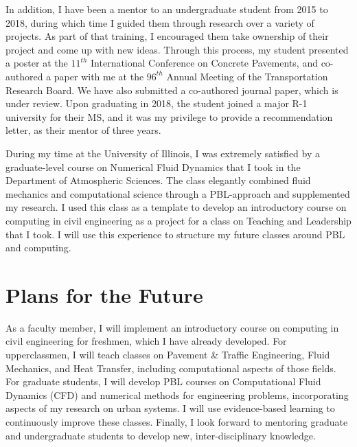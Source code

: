 \documentclass[12pt]{article}
\begin{document}
In addition, I have been a mentor to an undergraduate student from 2015 to 2018, during which time I guided them through research over a variety of projects. As part of that training, I encouraged them take ownership of their project and come up with new ideas. Through this process, my student presented a poster at the $11^{th}$ International Conference on Concrete Pavements, and co-authored a paper with me at the $96^{th}$ Annual Meeting of the Transportation Research Board. We have also submitted a co-authored journal paper, which is under review. Upon graduating in 2018, the student joined a major R-1 university for their MS, and it was my privilege to provide a recommendation letter, as their mentor of three years.

During my time at the University of Illinois, I was extremely satisfied by a graduate-level course on Numerical Fluid Dynamics that I took in the Department of Atmospheric Sciences. The class elegantly combined fluid mechanics and computational science through a PBL-approach and supplemented my research. I used this class as a template to develop an introductory course on computing in civil engineering as a project for a class on Teaching and Leadership that I took. I will use this experience to structure my future classes around PBL and computing. 

\section*{Plans for the Future}
As a faculty member, I will implement an introductory course on computing in civil engineering for freshmen, which I have already developed. For upperclassmen, I will teach classes on Pavement \& Traffic Engineering, Fluid Mechanics, and Heat Transfer, including computational aspects of those fields. For graduate students, I will develop PBL courses on Computational Fluid Dynamics (CFD) and numerical methods for engineering problems, incorporating aspects of my research on urban systems. I will use evidence-based learning to continuously improve these classes. Finally, I look forward to mentoring graduate and undergraduate students to develop new, inter-disciplinary knowledge.

 

\end{document}
